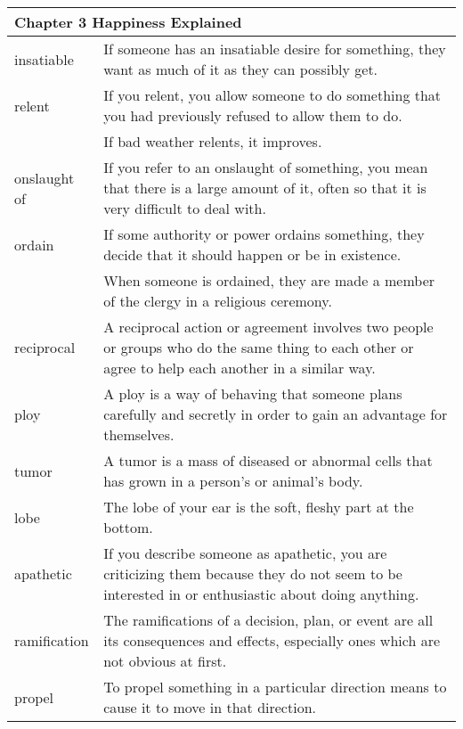 \documentclass{article}
\begin{document}
\begin{center}
\begin{longtable}{|l|p{7cm}|}
\hline
\multicolumn{2}{|l|}{\textbf{Chapter 3 Happiness Explained}}\\
\hline
insatiable
&
If someone has an insatiable desire for something, they want as much of it as they can possibly get.
\\

\hline
relent
&
If you relent, you allow someone to do something that you had previously refused to allow them to do.
\\

&
If bad weather relents, it improves.
\\

\hline
onslaught of
&
If you refer to an onslaught of something, you mean that there is a large amount of it, often so that it is very difficult to deal with.
\\

\hline
ordain
&
If some authority or power ordains something, they decide that it should happen or be in existence.
\\

&
When someone is ordained, they are made a member of the clergy in a religious ceremony.
\\

\hline
reciprocal
&
A reciprocal action or agreement involves two people or groups who do the same thing to each other or agree to help each another in a similar way.
\\

\hline
ploy
&
A ploy is a way of behaving that someone plans carefully and secretly in order to gain an advantage for themselves.
\\

\hline
tumor
&
A tumor is a mass of diseased or abnormal cells that has grown in a person's or animal's body.
\\

\hline
lobe
&
The lobe of your ear is the soft, fleshy part at the bottom.
\\

\hline
apathetic
&
If you describe someone as apathetic, you are criticizing them because they do not seem to be interested in or enthusiastic about doing anything.
\\

\hline
ramification
&
The ramifications of a decision, plan, or event are all its consequences and effects, especially ones which are not obvious at first.
\\

\hline
propel
&
To propel something in a particular direction means to cause it to move in that direction.
\\


\end{longtable}
\end{center}
\end{document}
